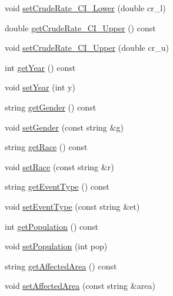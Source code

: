 \begin{DoxyCompactItemize}
\item 
void \mbox{\hyperlink{classbridges_1_1_cancer_incidence_a58cdb11fa6e8d2766d3ef98b1e8aea1f}{set\+Crude\+Rate\+\_\+\+C\+I\+\_\+\+Lower}} (double cr\+\_\+l)
\item 
double \mbox{\hyperlink{classbridges_1_1_cancer_incidence_abaa44824d7c7a88429c2ce429c4bdb4f}{get\+Crude\+Rate\+\_\+\+C\+I\+\_\+\+Upper}} () const
\item 
void \mbox{\hyperlink{classbridges_1_1_cancer_incidence_a40d654a767d9b20ffa6931591d96d42a}{set\+Crude\+Rate\+\_\+\+C\+I\+\_\+\+Upper}} (double cr\+\_\+u)
\item 
int \mbox{\hyperlink{classbridges_1_1_cancer_incidence_a61916d2b1e6fca8685f28fb62eccbc03}{get\+Year}} () const
\item 
void \mbox{\hyperlink{classbridges_1_1_cancer_incidence_ac4c0d949ebb21dd890afe2714962fa5a}{set\+Year}} (int y)
\item 
string \mbox{\hyperlink{classbridges_1_1_cancer_incidence_aacca8d4a69cbe53943541fb4e0f5c773}{get\+Gender}} () const
\item 
void \mbox{\hyperlink{classbridges_1_1_cancer_incidence_ad4b8d6d3b226567f60af07fa8e5d21ae}{set\+Gender}} (const string \&g)
\item 
string \mbox{\hyperlink{classbridges_1_1_cancer_incidence_ae6e0d4bc5aa55bc48891a43c433d59a7}{get\+Race}} () const
\item 
void \mbox{\hyperlink{classbridges_1_1_cancer_incidence_ae7cfd7532ab68ad521cc41d5172fd006}{set\+Race}} (const string \&r)
\item 
string \mbox{\hyperlink{classbridges_1_1_cancer_incidence_a9bf24d732657528f06081f53aae6f3b8}{get\+Event\+Type}} () const
\item 
void \mbox{\hyperlink{classbridges_1_1_cancer_incidence_af17d0ebdf1a67834947e9cf5828c8fe3}{set\+Event\+Type}} (const string \&et)
\item 
int \mbox{\hyperlink{classbridges_1_1_cancer_incidence_aa0720b4ec24093bb1949c06be65e0445}{get\+Population}} () const
\item 
void \mbox{\hyperlink{classbridges_1_1_cancer_incidence_aaade0295abaeeabb23b9e03d5ffd364a}{set\+Population}} (int pop)
\item 
string \mbox{\hyperlink{classbridges_1_1_cancer_incidence_a95c314f050d74a052f5f6e0bbe735b39}{get\+Affected\+Area}} () const
\item 
void \mbox{\hyperlink{classbridges_1_1_cancer_incidence_a4fc0d4133af2fef77b6b43c0d54f0e14}{set\+Affected\+Area}} (const string \&area)

\end{DoxyCompactItemize}

